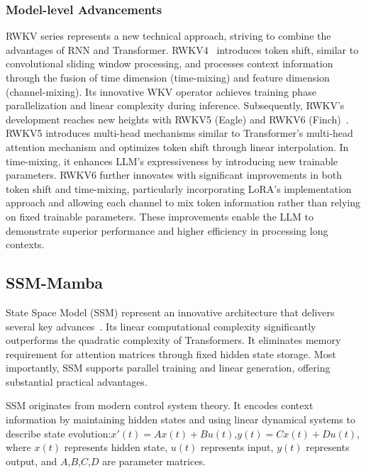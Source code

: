 \subsubsection{Model-level Advancements}
RWKV series represents a new technical approach, striving to combine the advantages of RNN and Transformer. RWKV4~\citep{peng2023rwkv} introduces token shift, similar to convolutional sliding window processing, and processes context information through the fusion of time dimension (time-mixing) and feature dimension (channel-mixing). Its innovative WKV operator achieves training phase parallelization and linear complexity during inference. Subsequently, RWKV's development reaches new heights with RWKV5 (Eagle) and RWKV6 (Finch)~\citep{peng2024eagle}. RWKV5 introduces multi-head mechanisms similar to Transformer's multi-head attention mechanism and optimizes token shift through linear interpolation. In time-mixing, it enhances LLM's expressiveness by introducing new trainable parameters. RWKV6 further innovates with significant improvements in both token shift and time-mixing, particularly incorporating LoRA's implementation approach and allowing each channel to mix token information rather than relying on fixed trainable parameters. These improvements enable the LLM to demonstrate superior performance and higher efficiency in processing long contexts.

\subsection{SSM-Mamba}\label{sec5_3}
State Space Model (SSM) represent an innovative architecture that delivers several key advances~\citep{gu2023mamba}. Its linear computational complexity significantly outperforms the quadratic complexity of Transformers. It eliminates memory requirement for attention matrices through fixed hidden state storage. Most importantly, SSM supports parallel training and linear generation, offering substantial practical advantages.

SSM originates from modern control system theory. It encodes context information by maintaining hidden states and using linear dynamical systems to describe state evolution:$x'(t)=Ax(t)+Bu(t)$,$y(t)=Cx(t)+Du(t)$, where $x(t)$ represents hidden state, $u(t)$ represents input, $y(t)$ represents output, and $A$,$B$,$C$,$D$ are parameter matrices. 

